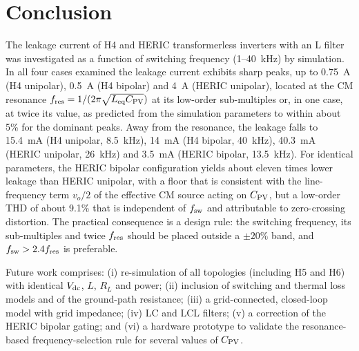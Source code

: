 \section{Conclusion}
\label{sec:conclusion}
The leakage current of H4 and HERIC transformerless inverters with an L filter was investigated as a function of switching frequency (1--40~kHz) by simulation. In all four cases examined the leakage current exhibits sharp peaks, up to 0.75~A (H4 unipolar), 0.5~A (H4 bipolar) and 4~A (HERIC unipolar), located at the CM resonance $f_{\mathrm{res}}=1/(2\pi\sqrt{L_{\mathrm{eq}}C_{\mathrm{PV}}})$ at its low-order sub-multiples or, in one case, at twice its value, as predicted from the simulation parameters to within about 5\% for the dominant peaks. Away from the resonance, the leakage falls to 15.4~mA (H4 unipolar, 8.5~kHz), 14~mA (H4 bipolar, 40~kHz), 40.3~mA (HERIC unipolar, 26~kHz) and 3.5~mA (HERIC bipolar, 13.5~kHz). For identical parameters, the HERIC bipolar configuration yields about eleven times lower leakage than HERIC unipolar, with a floor that is consistent with the line-frequency term $v_o/2$ of the effective CM source acting on $C_{\mathrm{PV}}$, but a low-order THD of about 9.1\% that is independent of $f_{\mathrm{sw}}$ and attributable to zero-crossing distortion. The practical consequence is a design rule: the switching frequency, its sub-multiples and twice $f_{\mathrm{res}}$ should be placed outside a $\pm20\%$ band, and $f_{\mathrm{sw}}>2.4f_{\mathrm{res}}$ is preferable.

Future work comprises: (i) re-simulation of all topologies (including H5 and H6) with identical $V_{\mathrm{dc}}$, $L$, $R_L$ and power; (ii) inclusion of switching and thermal loss models and of the ground-path resistance; (iii) a grid-connected, closed-loop model with grid impedance; (iv) LC and LCL filters; (v) a correction of the HERIC bipolar gating; and (vi) a hardware prototype to validate the resonance-based frequency-selection rule for several values of $C_{\mathrm{PV}}$.
